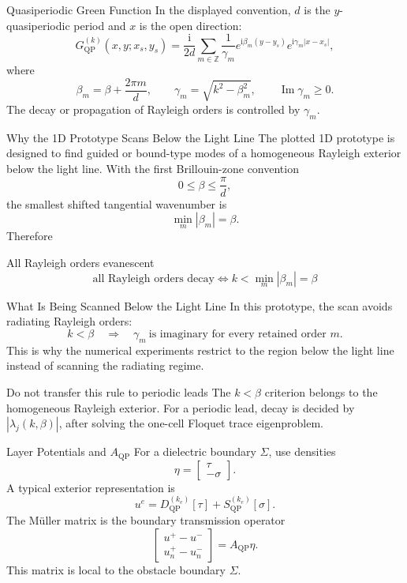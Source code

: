 \documentclass[aspectratio=169]{beamer}
\newcommand{\ii}{\mathrm{i}}
\begin{document}
\begin{frame}{Quasiperiodic Green Function}
  In the displayed convention, \(d\) is the \(y\)-quasiperiodic period and
  \(x\) is the open direction:
  \[
    G_{\mathrm{QP}}^{(k)}(x,y;x_s,y_s)
    =
    \frac{\ii}{2d}
    \sum_{m\in\mathbb Z}
    \frac{1}{\gamma_m}
    e^{\ii\beta_m(y-y_s)}
    e^{\ii\gamma_m|x-x_s|},
  \]
  where
  \[
    \beta_m=\beta+\frac{2\pi m}{d},
    \qquad
    \gamma_m=\sqrt{k^2-\beta_m^2},
    \qquad \operatorname{Im}\gamma_m\ge 0.
  \]
  The decay or propagation of Rayleigh orders is controlled by \(\gamma_m\).
\end{frame}

\begin{frame}{Why the 1D Prototype Scans Below the Light Line}
  The plotted 1D prototype is designed to find guided or bound-type modes
  of a homogeneous Rayleigh exterior below the light line.
  With the first Brillouin-zone convention
  \[
    0\le\beta\le\frac{\pi}{d},
  \]
  the smallest shifted tangential wavenumber is
  \[
    \min_m|\beta_m|=\beta.
  \]
  Therefore
  \begin{block}{All Rayleigh orders evanescent}
    \[
      \boxed{
      \text{all Rayleigh orders decay}
      \iff
      k<\min_m|\beta_m|=\beta
      }
    \]
  \end{block}
\end{frame}

\begin{frame}{What Is Being Scanned Below the Light Line}
  In this prototype, the scan avoids radiating Rayleigh orders:
  \[
    k<\beta
    \quad\Longrightarrow\quad
    \gamma_m\ \text{is imaginary for every retained order }m.
  \]
  This is why the numerical experiments restrict to the region below the
  light line instead of scanning the radiating regime.
  \begin{alertblock}{Do not transfer this rule to periodic leads}
    The \(k<\beta\) criterion belongs to the homogeneous Rayleigh exterior.
    For a periodic lead, decay is decided by \(|\lambda_j(k,\beta)|\), after
    solving the one-cell Floquet trace eigenproblem.
  \end{alertblock}
\end{frame}

\begin{frame}{Layer Potentials and \(A_{\mathrm{QP}}\)}
  For a dielectric boundary \(\Sigma\), use densities
  \[
    \eta=\begin{bmatrix}\tau\\-\sigma\end{bmatrix}.
  \]
  A typical exterior representation is
  \[
    u^e
    =
    D_{\mathrm{QP}}^{(k_e)}[\tau]
    +
    S_{\mathrm{QP}}^{(k_e)}[\sigma].
  \]
  The M\"uller matrix is the boundary transmission operator
  \[
    \begin{bmatrix}
      u^+ - u^-\\
      u_n^+ - u_n^-
    \end{bmatrix}
    =
    A_{\mathrm{QP}}\eta .
  \]
  This matrix is local to the obstacle boundary \(\Sigma\).
\end{frame}
\end{document}

